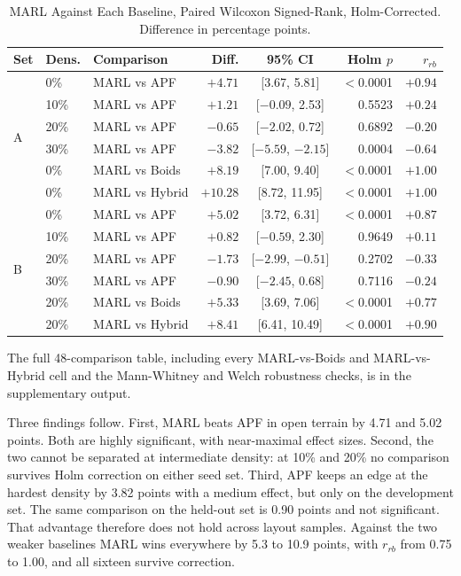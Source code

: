 \documentclass[a4paper, 10pt, conference]{ieeeconf}
\begin{document}
\begin{table}[htb]
\centering
\caption{MARL Against Each Baseline, Paired Wilcoxon Signed-Rank,
Holm-Corrected. Difference in percentage points.}
\label{tab:stats}
\scriptsize
\setlength{\tabcolsep}{1.6pt}
\begin{tabular}{lllrcrr}
\toprule
\textbf{Set} & \textbf{Dens.} & \textbf{Comparison} & \textbf{Diff.} &
\textbf{95\% CI} & \textbf{Holm $p$} & \textbf{$r_{rb}$} \\
\midrule
\multirow{6}{*}{A}
& 0\%  & MARL vs APF    & $+4.71$  & [3.67, 5.81]        & $<$0.0001 & $+0.94$ \\
& 10\% & MARL vs APF    & $+1.21$  & [$-0.09$, 2.53]     & 0.5523    & $+0.24$ \\
& 20\% & MARL vs APF    & $-0.65$  & [$-2.02$, 0.72]     & 0.6892    & $-0.20$ \\
& 30\% & MARL vs APF    & $-3.82$  & [$-5.59$, $-2.15$]  & 0.0004    & $-0.64$ \\
& 0\%  & MARL vs Boids  & $+8.19$  & [7.00, 9.40]        & $<$0.0001 & $+1.00$ \\
& 0\%  & MARL vs Hybrid & $+10.28$ & [8.72, 11.95]       & $<$0.0001 & $+1.00$ \\
\midrule
\multirow{6}{*}{B}
& 0\%  & MARL vs APF    & $+5.02$  & [3.72, 6.31]        & $<$0.0001 & $+0.87$ \\
& 10\% & MARL vs APF    & $+0.82$  & [$-0.59$, 2.30]     & 0.9649    & $+0.11$ \\
& 20\% & MARL vs APF    & $-1.73$  & [$-2.99$, $-0.51$]  & 0.2702    & $-0.33$ \\
& 30\% & MARL vs APF    & $-0.90$  & [$-2.45$, 0.68]     & 0.7116    & $-0.24$ \\
& 20\% & MARL vs Boids  & $+5.33$  & [3.69, 7.06]        & $<$0.0001 & $+0.77$ \\
& 20\% & MARL vs Hybrid & $+8.41$  & [6.41, 10.49]       & $<$0.0001 & $+0.90$ \\
\bottomrule
\end{tabular}

\vspace{0.3em}
{\footnotesize The full 48-comparison table, including every
MARL-vs-Boids and MARL-vs-Hybrid cell and the Mann-Whitney and Welch
robustness checks, is in the supplementary output.}
\end{table}

Three findings follow. First, MARL beats APF in open terrain by 4.71
and 5.02 points. Both are highly significant, with near-maximal effect
sizes. Second, the two cannot be separated at intermediate density: at
10\% and 20\% no comparison survives Holm correction on either seed
set. Third, APF keeps an edge at the hardest density by 3.82 points
with a medium effect, but only on the development set. The same
comparison on the held-out set is 0.90 points and not significant.
That advantage therefore does not hold across layout samples. Against
the two weaker baselines MARL wins everywhere by 5.3 to 10.9 points,
with $r_{rb}$ from 0.75 to 1.00, and all sixteen survive correction.
\end{document}
